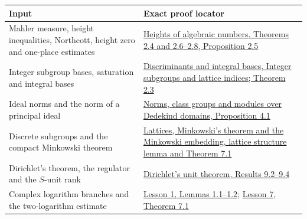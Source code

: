\documentclass[
  11pt,
  a4paper,
]{article}
\newcounter{none} %
\begin{document}
{\def\LTcaptype{none} %
\begin{longtable}[]{@{}
  >{\raggedright\arraybackslash}p{}
  >{\raggedright\arraybackslash}p{}@{}}
\toprule\noalign{}
\begin{minipage}[b]{\linewidth}\raggedright
Input
\end{minipage} & \begin{minipage}[b]{\linewidth}\raggedright
Exact proof locator
\end{minipage} \\
\midrule\noalign{}
\endhead
\bottomrule\noalign{}
\endlastfoot
Mahler measure, height inequalities, Northcott, height zero and
one-place estimates & \href{https://kokunoyumeto.github.io/open-math-courses-public/courses/TR-TRANS/TR-TRANS-02.html}{Heights of
algebraic numbers, Theorems 2.4 and 2.6--2.8, Proposition 2.5} \\
Integer subgroup bases, saturation and integral bases &
\href{https://kokunoyumeto.github.io/open-math-courses-public/courses/NT-ANT/discriminants-and-integral-bases.html\#integer-subgroups-and-lattice-indices}{Discriminants
and integral bases, Integer subgroups and lattice indices; Theorem
2.3} \\
Ideal norms and the norm of a principal ideal &
\href{https://kokunoyumeto.github.io/open-math-courses-public/courses/NT-ANT/norms-class-groups-and-modules-over-dedekind-domains.html}{Norms,
class groups and modules over Dedekind domains, Proposition 4.1} \\
Discrete subgroups and the compact Minkowski theorem &
\href{https://kokunoyumeto.github.io/open-math-courses-public/courses/NT-ANT/lattices-minkowskis-theorem-and-the-minkowski-embedding.html}{Lattices,
Minkowski's theorem and the Minkowski embedding, lattice structure lemma
and Theorem 7.1} \\
Dirichlet's theorem, the regulator and the \(S\)-unit rank &
\href{https://kokunoyumeto.github.io/open-math-courses-public/courses/NT-ANT/dirichlets-unit-theorem.html}{Dirichlet's unit
theorem, Results 9.2--9.4} \\
Complex logarithm branches and the two-logarithm estimate &
\href{https://kokunoyumeto.github.io/open-math-courses-public/courses/TR-BAKER/TR-BAKER-01.html}{Lesson 1, Lemmas 1.1--1.2};
\href{https://kokunoyumeto.github.io/open-math-courses-public/courses/TR-BAKER/TR-BAKER-07.html\#1-an-explicit-bound-without-multiplicative-independence}{Lesson
7, Theorem 7.1} \\
\end{longtable}
}
\end{document}
